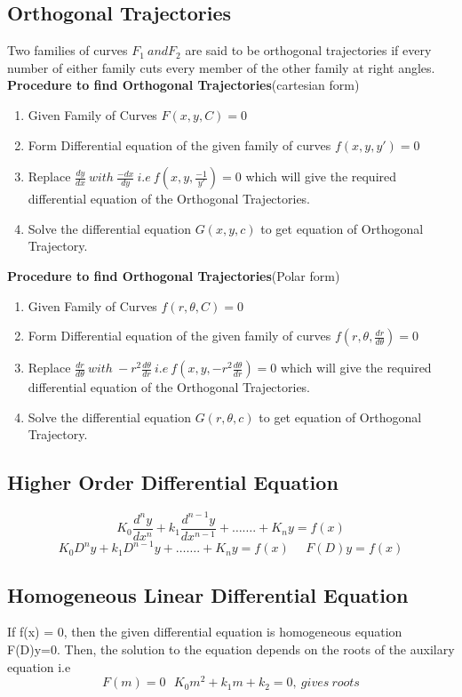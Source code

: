 \subsection{Orthogonal Trajectories}
Two families of curves \(F_1\ and F_2\) are said to be orthogonal trajectories if every number of either family cuts every member of the other family at right angles.\\
\textbf{Procedure to find Orthogonal Trajectories}(cartesian form)
\begin{enumerate}
    \item Given Family of Curves \(F(x, y, C) = 0\)
    \item Form Differential equation of the given family of curves \(f(x, y, y') = 0\)
    \item Replace \(\frac{dy}{dx}\ with\ \frac{-dx}{dy}\ i.e\ f\left(x, y, \frac{-1}{y'}\right)=0\) which will give the required differential equation of the Orthogonal Trajectories.
    \item Solve the differential equation \(G(x,y,c)\) to get equation of Orthogonal Trajectory. 
\end{enumerate}
\textbf{Procedure to find Orthogonal Trajectories}(Polar form)
\begin{enumerate}
    \item Given Family of Curves \(f(r, \theta, C) = 0\)
    \item Form Differential equation of the given family of curves \(f\left(r, \theta, \frac{dr}{d\theta}\right) = 0\)
    \item Replace \(\frac{dr}{d\theta}\ with\ -r^2\frac{d\theta}{dr}\ i.e\ f\left(x, y, -r^2\frac{d\theta}{dr}\right)=0\) which will give the required differential equation of the Orthogonal Trajectories.
    \item Solve the differential equation \(G(r,\theta,c)\) to get equation of Orthogonal Trajectory. 
\end{enumerate}


\subsection{Higher Order Differential Equation}
\[K_0 \frac{d^ny}{dx^n}+k_1\frac{d^{n-1}y}{dx^{n-1}}+\ldots\ldots.+K_ny=f(x)\]
\[K_0D^ny+k_1D^{n-1}y+\ldots\ldots.+K_ny=f(x)\ \ \ \ \ \ F(D)y=f(x)\]
\subsection*{Homogeneous Linear Differential Equation}
If f(x) = 0, then the given differential equation is homogeneous equation F(D)y=0. Then, the solution to the equation depends on the roots of the auxilary equation i.e \[F(m)=0\ \ \ K_0m^2+k_1m+k_2=0,\ gives\ roots\]

